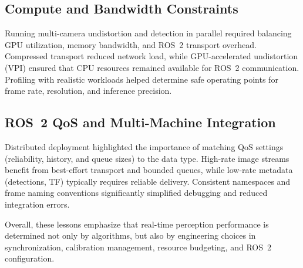 \documentclass[12pt,a4paper]{report}
\begin{document}
\subsection{Compute and Bandwidth Constraints}
Running multi-camera undistortion and detection in parallel required balancing GPU utilization, memory bandwidth, and ROS~2 transport overhead. Compressed transport reduced network load, while GPU-accelerated undistortion (VPI) ensured that CPU resources remained available for ROS~2 communication. Profiling with realistic workloads helped determine safe operating points for frame rate, resolution, and inference precision.

\subsection{ROS~2 QoS and Multi-Machine Integration}
Distributed deployment highlighted the importance of matching QoS settings (reliability, history, and queue sizes) to the data type. High-rate image streams benefit from best-effort transport and bounded queues, while low-rate metadata (detections, TF) typically requires reliable delivery. Consistent namespaces and frame naming conventions significantly simplified debugging and reduced integration errors.

Overall, these lessons emphasize that real-time perception performance is determined not only by algorithms, but also by engineering choices in synchronization, calibration management, resource budgeting, and ROS~2 configuration.

\end{document}
